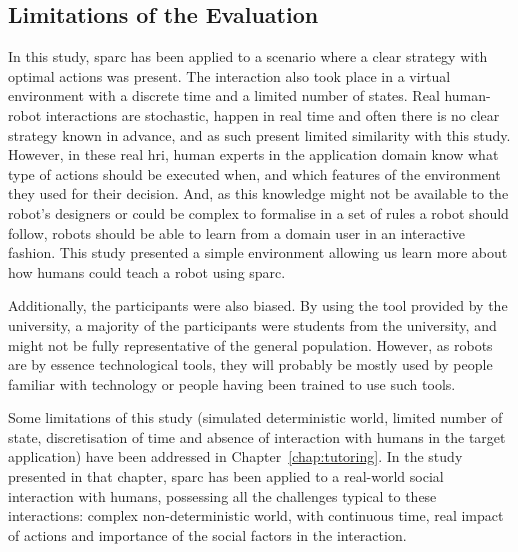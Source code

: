 \subsection{Limitations of the Evaluation}

In this study, \gls{sparc} has been applied to a scenario where a clear strategy with optimal actions was present. The interaction also took place in a virtual environment with a discrete time and a limited number of states. Real human-robot interactions are stochastic, happen in real time and often there is no clear strategy known in advance, and as such present limited similarity with this study. However, in these real \gls{hri}, human experts in the application domain know what type of actions should be executed when, and which features of the environment they used for their decision. And, as this knowledge might not be available to the robot's designers or could be complex to formalise in a set of rules a robot should follow, robots should be able to learn from a domain user in an interactive fashion. This study presented a simple environment allowing us learn more about how humans could teach a robot using \gls{sparc}.

Additionally, the participants were also biased. By using the tool provided by the university, a majority of the participants were students from the university, and might not be fully representative of the general population. However, as robots are by essence technological tools, they will probably be mostly used by people familiar with technology or people having been trained to use such tools. 

Some limitations of this study (simulated deterministic world, limited number of state, discretisation of time and absence of interaction with humans in the target application) have been addressed in Chapter~\ref{chap:tutoring}. In the study presented in that chapter, \gls{sparc} has been applied to a real-world social interaction with humans, possessing all the challenges typical to these interactions: complex non-deterministic world, with continuous time, real impact of actions and importance of the social factors in the interaction.

